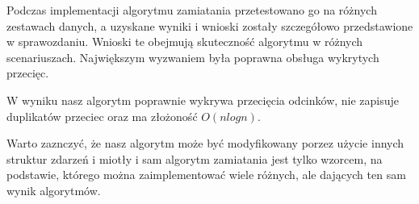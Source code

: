 \quad Podczas implementacji algorytmu zamiatania przetestowano go na różnych zestawach danych, a uzyskane wyniki i wnioski zostały szczegółowo przedstawione w sprawozdaniu. Wnioski te obejmują skuteczność algorytmu w różnych scenariuszach. Największym wyzwaniem była poprawna obsługa wykrytych przecięc.

W wyniku nasz algorytm poprawnie wykrywa przecięcia odcinków, nie zapisuje duplikatów przeciec oraz ma złożoność $O(nlogn)$.

Warto zaznczyć, że nasz algorytm może być modyfikowany porzez użycie innych struktur zdarzeń i miotły i sam algorytm zamiatania jest tylko wzorcem, na podstawie, którego można zaimplementować wiele różnych, ale dających ten sam wynik algorytmów.

